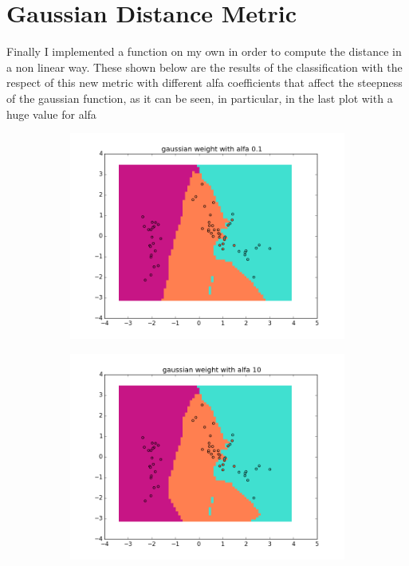 \documentclass{article}
\begin{document}
				\section{Gaussian Distance Metric}
				Finally I implemented a function on my own in order to compute the distance in a non linear way. These shown below are the results of the classification with the respect of this new metric with different alfa coefficients that affect the steepness of the gaussian function, as it can be seen, in particular, in the last plot with a huge value for alfa
								\begin{center}
				\begin{figure}
\centering  
        \begin{subfigure}[b]{0.48\textwidth}
                \centering
                \includegraphics[width=\linewidth]{figure_15}
        \end{subfigure}\hfill
        \begin{subfigure}[b]{0.48\textwidth}
                \centering
                \includegraphics[width=\linewidth]{figure_16}
        \end{subfigure}
        \label{fig:10}
\end{figure}


\end{center}
\end{document}
